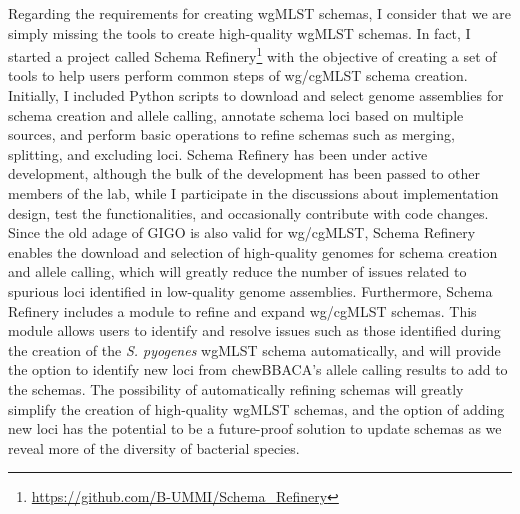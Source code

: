 Regarding the requirements for creating \ac{wgMLST} schemas, I consider that we are simply missing the tools to create high-quality \ac{wgMLST} schemas. In fact, I started a project called Schema Refinery\footnote{\url{https://github.com/B-UMMI/Schema_Refinery}} with the objective of creating a set of tools to help users perform common steps of \ac{wg/cgMLST} schema creation. Initially, I included Python scripts to download and select genome assemblies for schema creation and allele calling, annotate schema loci based on multiple sources, and perform basic operations to refine schemas such as merging, splitting, and excluding loci. Schema Refinery has been under active development, although the bulk of the development has been passed to other members of the lab, while I participate in the discussions about implementation design, test the functionalities, and occasionally contribute with code changes. Since the old adage of \ac{GIGO} is also valid for \ac{wg/cgMLST}, Schema Refinery enables the download and selection of high-quality genomes for schema creation and allele calling, which will greatly reduce the number of issues related to spurious loci identified in low-quality genome assemblies. Furthermore, Schema Refinery includes a module to refine and expand \ac{wg/cgMLST} schemas. This module allows users to identify and resolve issues such as those identified during the creation of the \textit{S. pyogenes} \ac{wgMLST} schema automatically, and will provide the option to identify new loci from chewBBACA's allele calling results to add to the schemas. The possibility of automatically refining schemas will greatly simplify the creation of high-quality \ac{wgMLST} schemas, and the option of adding new loci has the potential to be a future-proof solution to update schemas as we reveal more of the diversity of bacterial species.

